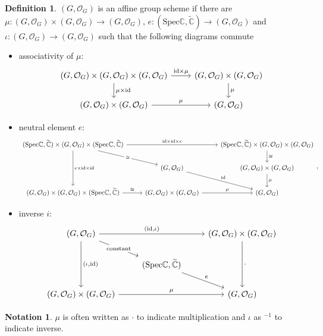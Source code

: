 \documentclass{article}
\theoremstyle{definition}
\newtheorem{definition}{Definition}
\newtheorem*{notation}{Notation}
\newcommand{\Spec}{\mathrm{Spec}}
\newcommand{\ssheaf}[1]{\widetilde{#1}}
\newcommand{\so}[1]{(#1, \mathcal O_{#1})}
\newcommand{\id}{\mathrm{id}}
\newcommand{\sr}[1]{(\Spec{#1},\ssheaf{#1})}
\begin{document}
\begin{definition}
$\so G$ is an affine group scheme if there are $\mu: \so G\times\so G\to\so G$, $e:(\Spec\mathbb C,\widetilde{\mathbb C})\to\so G$ and $\iota:\so G\to\so G$ such that the following diagrams commute
\begin{itemize}
\item associativity of $\mu$:
\begin{equation*}
\begin{tikzcd}
\so G\times\so G\times\so G \arrow[r,"{\id\times\mu}"] \arrow[d,"\mu\times\id"] & 
\so G\times\so G\arrow[d, "\mu"] \\
\so G\times\so G \arrow[r, "\mu"] & \so G
\end{tikzcd}
\end{equation*}


\item neutral element $e$:
\begin{equation*}
\begin{tikzcd}
\sr{\mathbb C}\times\so G\times\sr{\mathbb C}\arrow[rr,"{\id\times\id\times e}"]\arrow[rd, "{\cong}" description]
\arrow[dd,"{e\times\id\times\id}"] 
& & 
\sr{\mathbb C}\times\so G\times\so G
\arrow[d,"\cong"] \\
& \so G \arrow[rd, "\id"]& \so G\times\so G\arrow[d, "\mu"] \\
\so G\times\so G\times\sr{\mathbb C}\arrow[r,"\cong"] & \so G\times\so G\arrow[r, "\mu"] &\so G
\end{tikzcd},
\end{equation*}

\item inverse $i$:
\begin{equation*}
\begin{tikzcd}
    \so G\arrow[rr,"{(\id,\iota)}"]
    \arrow[rd, "\text{constant}" description] \arrow[dd, "{(\iota, \id)}"] & & \so G\times \so G \arrow[dd, "\cdot"] \\
	& \sr{\mathbb C} \arrow[rd, "e"] & \\
\so G\times\so G\arrow[rr, "\mu"] & & \so G
\end{tikzcd}
\end{equation*}

\end{itemize}

\begin{notation}
$\mu$ is often written as $\cdot$ to indicate multiplication and $\iota$ as $^{-1}$ to indicate inverse.
\end{notation}
\label{def:group-scheme}
\end{definition}
\end{document}
